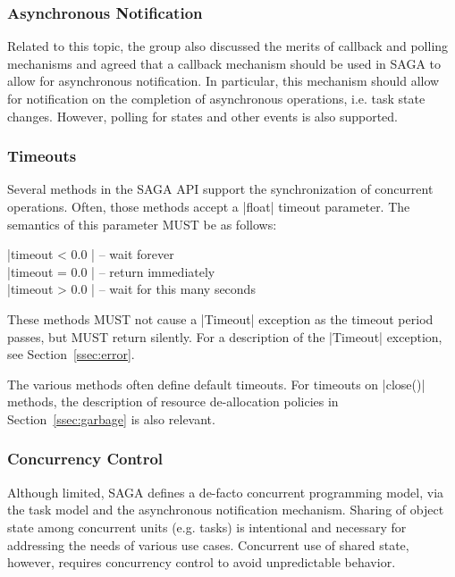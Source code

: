   \subsubsection{Asynchronous Notification}

   Related to this topic, the group also discussed the merits of
   callback and polling mechanisms and agreed that a callback
   mechanism should be used in SAGA to allow for asynchronous
   notification.  In particular, this mechanism should allow for
   notification on the completion of asynchronous operations,
   i.e.  task state changes.  However, polling for states and
   other events is also supported.

  \subsubsection{Timeouts}
   \label{ssec:timeout}

   Several methods in the SAGA API support the synchronization
   of concurrent operations.  Often, those methods accept a
   |float| timeout parameter.  The semantics of this 
   parameter MUST be as follows:

   \shift |timeout < 0.0 | -- wait forever\\
   \shift |timeout = 0.0 | -- return immediately\\
   \shift |timeout > 0.0 | -- wait for this many seconds

   These methods  MUST not cause a |Timeout| exception
   as the timeout period passes, but MUST return silently.  For
   a description of the |Timeout| exception, see
   Section~\ref{ssec:error}.

   The various methods often define  default
   timeouts.  For timeouts on |close()| methods, the description
   of resource de-allocation policies in
   Section~\ref{ssec:garbage} is also relevant.


  \subsubsection{Concurrency Control}
  \label{ssec:concurrency}

   Although limited, SAGA defines a de-facto concurrent
   programming model, via the task model and the asynchronous
   notification mechanism. Sharing of object state among
   concurrent units (e.g. tasks) is intentional and necessary
   for addressing the needs of various use cases. Concurrent use
   of shared state, however, requires concurrency control to
   avoid unpredictable behavior.

